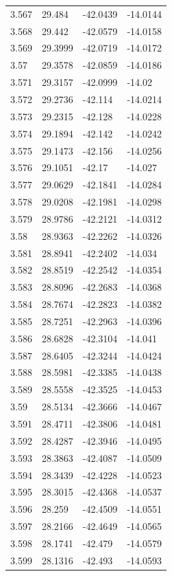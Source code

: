 \begin{tabular}{llll}
3.567 & 29.484 & -42.0439 & -14.0144 \\
3.568 & 29.442 & -42.0579 & -14.0158 \\
3.569 & 29.3999 & -42.0719 & -14.0172 \\
3.57 & 29.3578 & -42.0859 & -14.0186 \\
3.571 & 29.3157 & -42.0999 & -14.02 \\
3.572 & 29.2736 & -42.114 & -14.0214 \\
3.573 & 29.2315 & -42.128 & -14.0228 \\
3.574 & 29.1894 & -42.142 & -14.0242 \\
3.575 & 29.1473 & -42.156 & -14.0256 \\
3.576 & 29.1051 & -42.17 & -14.027 \\
3.577 & 29.0629 & -42.1841 & -14.0284 \\
3.578 & 29.0208 & -42.1981 & -14.0298 \\
3.579 & 28.9786 & -42.2121 & -14.0312 \\
3.58 & 28.9363 & -42.2262 & -14.0326 \\
3.581 & 28.8941 & -42.2402 & -14.034 \\
3.582 & 28.8519 & -42.2542 & -14.0354 \\
3.583 & 28.8096 & -42.2683 & -14.0368 \\
3.584 & 28.7674 & -42.2823 & -14.0382 \\
3.585 & 28.7251 & -42.2963 & -14.0396 \\
3.586 & 28.6828 & -42.3104 & -14.041 \\
3.587 & 28.6405 & -42.3244 & -14.0424 \\
3.588 & 28.5981 & -42.3385 & -14.0438 \\
3.589 & 28.5558 & -42.3525 & -14.0453 \\
3.59 & 28.5134 & -42.3666 & -14.0467 \\
3.591 & 28.4711 & -42.3806 & -14.0481 \\
3.592 & 28.4287 & -42.3946 & -14.0495 \\
3.593 & 28.3863 & -42.4087 & -14.0509 \\
3.594 & 28.3439 & -42.4228 & -14.0523 \\
3.595 & 28.3015 & -42.4368 & -14.0537 \\
3.596 & 28.259 & -42.4509 & -14.0551 \\
3.597 & 28.2166 & -42.4649 & -14.0565 \\
3.598 & 28.1741 & -42.479 & -14.0579 \\
3.599 & 28.1316 & -42.493 & -14.0593 \\

\end{tabular}
